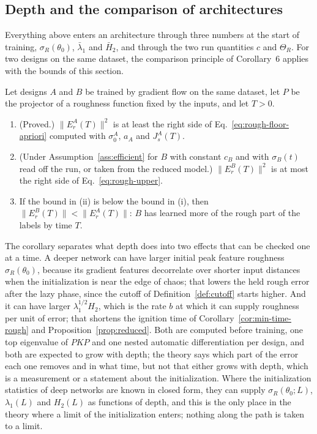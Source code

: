 \subsection{Depth and the comparison of architectures}

Everything above enters an architecture through three numbers at the start of
training, $\sigma_R(\theta_0)$, $\bar\lambda_1$ and $\bar H_2$, and through
the two run quantities $c$ and $\Theta_R$. For two designs on the same
dataset, the comparison principle of Corollary~6 applies with the bounds of
this section.

\begin{corollary}
\label{cor:depth}
Let designs $A$ and $B$ be trained by gradient flow on the same dataset, let
$P$ be the projector of a roughness function fixed by the inputs, and let
$T>0$.
\begin{enumerate}
\item[(i)] (Proved.) $\|E_r^A(T)\|^2$ is at least the right side of
Eq.~\eqref{eq:rough-floor-apriori} computed with $\sigma_0^A$, $a_A$ and
$J_s^A(T)$.
\item[(ii)] (Under Assumption~\ref{ass:efficient} for $B$ with constant $c_B$
and with $\sigma_B(t)$ read off the run, or taken from the reduced model.)
$\|E_r^B(T)\|^2$ is at most the right side of Eq.~\eqref{eq:rough-upper}.
\item[(iii)] If the bound in (ii) is below the bound in (i), then
$\|E_r^B(T)\|<\|E_r^A(T)\|$: $B$ has learned more of the rough part of the
labels by time $T$.
\end{enumerate}
\end{corollary}

The corollary separates what depth does into two effects that can be checked
one at a time. A deeper network can have larger initial peak feature
roughness $\sigma_R(\theta_0)$, because its gradient features decorrelate over
shorter input distances when the initialization is near the edge of chaos;
that lowers the held rough error after the lazy phase, since the cutoff of
Definition~\ref{def:cutoff} starts higher. And it can have larger
$\lambda_1^{1/2}H_2$, which is the rate $b$ at which it can supply roughness
per unit of error; that shortens the ignition time of
Corollary~\ref{cor:min-time-rough} and Proposition~\ref{prop:reduced}. Both
are computed before training, one top eigenvalue of $PKP$ and one nested
automatic differentiation per design, and both are expected to grow with
depth; the theory says which part of the error each one removes and in what
time, but not that either grows with depth, which is a measurement or a
statement about the initialization. Where the initialization statistics of
deep networks are known in closed form, they can supply $\sigma_R(\theta_0;L)$,
$\lambda_1(L)$ and $H_2(L)$ as functions of depth, and this is the only place
in the theory where a limit of the initialization enters; nothing along the
path is taken to a limit.

